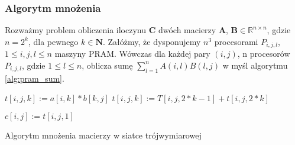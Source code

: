 

\subsubsection{Algorytm mnożenia}
Rozważmy problem obliczenia iloczynu \(\mathbf{C}\) dwóch macierzy \(\mathbf{A}\), \(\mathbf{B}\in\mathbb{R}^{n\times n}\), gdzie \(n=2^k\), dla pewnego \(k\in\mathbf{N}\). Załóżmy, że dysponujemy \(n^3\) procesorami \(P_{i,j,l}\), \(1\leq i, j, l \leq n\) maszyny PRAM. Wówczas dla każdej pary \((i, j)\), n procesorów \(P_{i,j,l}\), gdzie \(1\leq l \leq n\), oblicza sumę \(\sum_{l=1}^{n}A(i,l)B(l,j)\) w myśl algorytmu \ref{alg:pram_sum}.\\

\begin{algorithm}
\centering
\begin{algorithmic}
\State \(t[i,j,k] := a[i,k]*b[k,j]\)
\EndParFor
{} 
	\State \(t[i,j,k] := T[i,j,2*k-1]+t[i,j,2*k]\)
\EndParFor
\EndFor

\State \(c[i,j] := t[i,j,1] \)
\EndParFor
\end{algorithmic}
\caption{Algorytm mnożenia macierzy w siatce trójwymiarowej}
\label{alg:pram_sum}
\end{algorithm}



